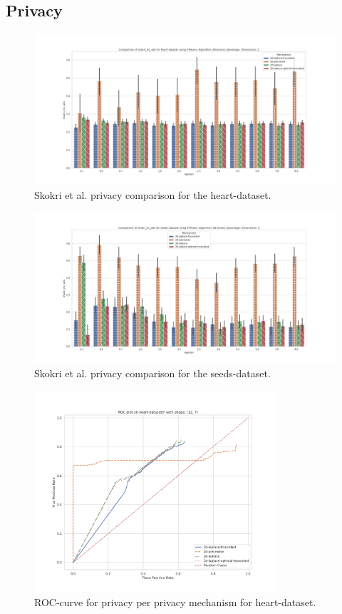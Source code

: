 \subsection{Privacy}
\begin{figure}[H]
    \includegraphics[width=\textwidth]{Results/RQ1/heart-dataset/shokri_mi_adv_heart-dataset_comparison.png}
    \caption{Skokri et al. privacy comparison for the heart-dataset.}
    \label{fig:privacy_heart-dataset_comparison_2d}
\end{figure}
\begin{figure}[H]
    \includegraphics[width=\textwidth]{Results/RQ1/seeds-dataset/shokri_mi_adv_seeds-dataset_comparison.png}
    \caption{Skokri et al. privacy comparison for the seeds-dataset.}
    \label{fig:privacy_seeds-dataset_comparison_2d}
\end{figure}
\begin{figure}[H]
    \includegraphics[width=0.8\textwidth]{Results/RQ1/heart-dataset/roc_plot.png}
    \caption{ROC-curve for privacy per privacy mechanism for heart-dataset.}
    \label{fig:privacy_heart-dataset_comparison_2d_roc_plot}
\end{figure}


